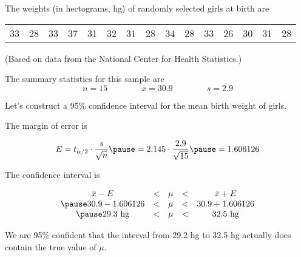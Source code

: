 \documentclass{beamer}
\begin{document}
\begin{frame}
\begin{example}
The weights (in hectograms, hg) of randomly selected girls at birth are

\vspace{-7mm}
\begin{center}
\begin{tabular}{ccccccccccccccc}
33 & 28 & 33 & 37 & 31 & 32 & 31 & 28 & 34 & 28 & 33 & 26 & 30 & 31 & 28
\end{tabular}
\end{center}

\vspace{-3mm}
(Based on data from the National Center for Health Statistics.)\pause

\vspace{1mm}
The summary statistics for this sample are
\vspace{-2mm}
\begin{equation*}
n = 15
\qquad\qquad \bar{x} = 30.9
\qquad\qquad s  = 2.9
\end{equation*}\pause

\vspace{-7mm}
Let's construct a 95\% confidence interval for the mean birth weight of girls.\pause

\vspace{1mm}
The margin of error is

\vspace{-3mm}
\begin{equation*}
E=t_{\alpha/2}\cdot\dfrac{s}{\sqrt{n}}\pause
=2.145\cdot\dfrac{2.9}{\sqrt{15}}\pause
=1.606126
\end{equation*}\pause

\vspace{-4mm}
The confidence interval is

\vspace{-3mm}
\begin{equation*}
\begin{matrix}
\bar{x} - E &<& \mu &<& \bar{x} + E\\\pause
30.9 - 1.606126 &<& \mu &<& 30.9 + 1.606126 \\\pause
29.3~\text{hg} &<& \mu &<& 32.5~\text{hg} \\
\end{matrix}
\end{equation*}\pause

\vspace{-3mm}
We are 95\% confident that the interval from 29.2 hg to 32.5 hg actually does contain the true value of $\mu$.
\end{example}
\end{frame}
\end{document}
